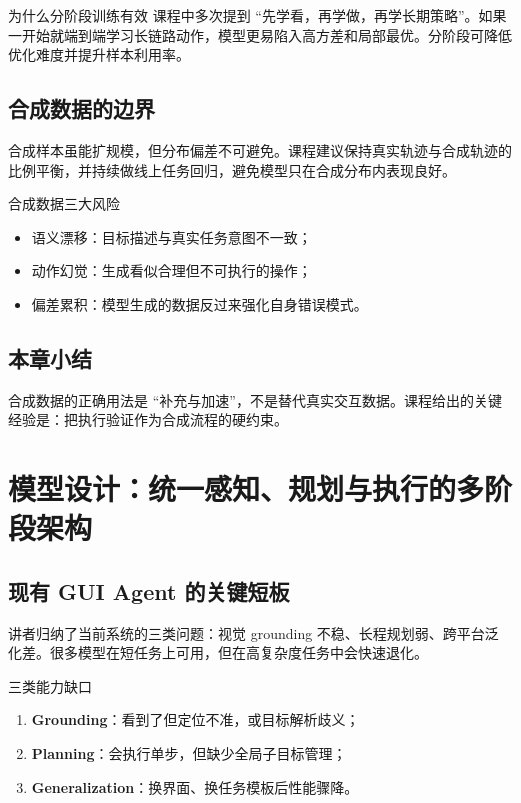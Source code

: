 \documentclass[a4paper]{article}
\begin{document}
\begin{knowledgebox}{为什么分阶段训练有效}
课程中多次提到 ``先学看，再学做，再学长期策略''。如果一开始就端到端学习长链路动作，模型更易陷入高方差和局部最优。分阶段可降低优化难度并提升样本利用率。
\end{knowledgebox}

\subsection{合成数据的边界}
合成样本虽能扩规模，但分布偏差不可避免。课程建议保持真实轨迹与合成轨迹的比例平衡，并持续做线上任务回归，避免模型只在合成分布内表现良好。

\begin{warningbox}{合成数据三大风险}
\begin{itemize}
    \item 语义漂移：目标描述与真实任务意图不一致；
    \item 动作幻觉：生成看似合理但不可执行的操作；
    \item 偏差累积：模型生成的数据反过来强化自身错误模式。
\end{itemize}
\end{warningbox}

\subsection{本章小结}
合成数据的正确用法是 ``补充与加速''，不是替代真实交互数据。课程给出的关键经验是：把执行验证作为合成流程的硬约束。

\section{模型设计：统一感知、规划与执行的多阶段架构}

\subsection{现有 GUI Agent 的关键短板}
讲者归纳了当前系统的三类问题：视觉 grounding 不稳、长程规划弱、跨平台泛化差。很多模型在短任务上可用，但在高复杂度任务中会快速退化。

\begin{importantbox}{三类能力缺口}
\begin{enumerate}
    \item \textbf{Grounding}：看到了但定位不准，或目标解析歧义；
    \item \textbf{Planning}：会执行单步，但缺少全局子目标管理；
    \item \textbf{Generalization}：换界面、换任务模板后性能骤降。
\end{enumerate}
\end{importantbox}
\end{document}
